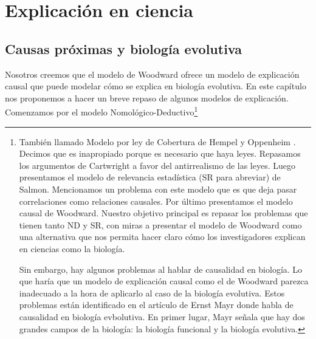 
\chapter{Explicación en ciencia}

\section{Causas próximas y biología evolutiva}

\noindent  Nosotros creemos que el modelo de Woodward ofrece un modelo de explicación causal que puede modelar cómo se explica en biología evolutiva. En este capítulo nos proponemos a hacer un breve repaso de algunos modelos de explicación. Comenzamos por el modelo Nomológico-Deductivo\footnote{También llamado Modelo por ley de Cobertura de Hempel y Oppenheim \citeyear{Hempel1948}. Decimos que es inapropiado porque es necesario que haya leyes. Repasamos los argumentos de Cartwright a favor del antirrealismo de las leyes. Luego presentamos el modelo de relevancia estadística (SR para abreviar) de Salmon. Mencionamos un problema con este modelo que es que deja pasar correlaciones como relaciones causales.  Por último presentamos el modelo causal de Woodward. Nuestro objetivo principal es repasar los problemas que tienen tanto ND y SR, con miras a presentar el modelo de Woodward como una alternativa que nos permita hacer claro cómo los investigadores explican en ciencias como la biología.


Sin embargo, hay algunos problemas al hablar de causalidad en biología. Lo que haría que un modelo de explicación causal como el de Woodward parezca inadecuado a la hora de aplicarlo al caso de la biología evolutiva. Estos problemas están identificado en el artículo de Ernst Mayr \citeyear{Mayr1998} donde habla de causalidad en biología evbolutiva. En primer lugar, Mayr señala que hay dos grandes campos de la biología: la biología funcional y la biología evolutiva.

}
